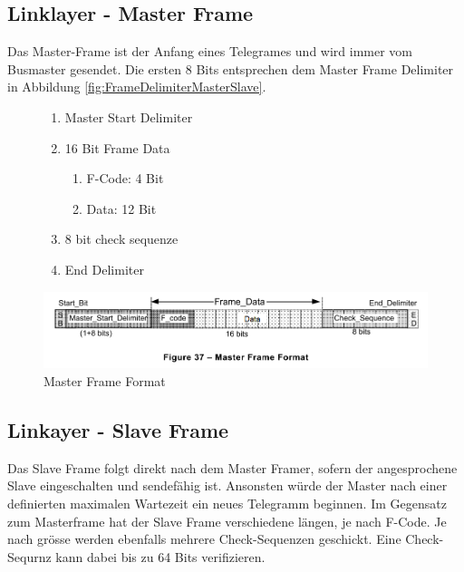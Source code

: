 \newpage

\subsection{Linklayer - Master Frame}
Das Master-Frame ist der Anfang eines Telegrames und wird immer vom Busmaster gesendet. Die ersten 8 Bits entsprechen dem Master Frame Delimiter in Abbildung \ref{fig:FrameDelimiterMasterSlave}. 

\begin{figure}[h!]
    \centering
    \begin{minipage}{0.33 \textwidth}
        \centering
        \begin{enumerate}
            \item Master Start Delimiter
            \item 16 Bit Frame Data
            \begin{enumerate}
                \item F-Code: 4 Bit
                \item Data: 12 Bit
            \end{enumerate}
            \item 8 bit check sequenze 
            \item End Delimiter
        \end{enumerate}
    \end{minipage}
    \hfill
    \begin{minipage}{0.65 \textwidth}
        \includegraphics[width = \textwidth]{Figures/Chap2/Grundlagen/MVB_DOKU/Frames und Telegramme/Fig37_MasterFrameFormat.png}
        \caption{Master Frame Format}
        \label{fig:MasterFrameFormat}
    \end{minipage}
        
\end{figure}

\subsection{Linkayer - Slave Frame}
Das Slave Frame folgt direkt nach dem Master Framer, sofern der angesprochene Slave eingeschalten und sendefähig ist. Ansonsten würde der Master nach einer definierten maximalen Wartezeit ein neues Telegramm beginnen. \newline
Im Gegensatz zum Masterframe hat der Slave Frame verschiedene längen, je nach F-Code. Je nach grösse werden ebenfalls mehrere Check-Sequenzen geschickt. Eine Check-Sequrnz kann dabei bis zu 64 Bits verifizieren.


